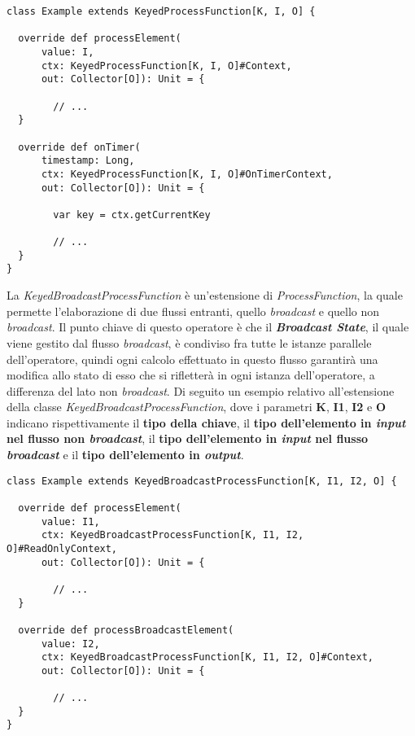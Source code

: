 \begin{verbatim}
class Example extends KeyedProcessFunction[K, I, O] {

  override def processElement(
      value: I, 
      ctx: KeyedProcessFunction[K, I, O]#Context, 
      out: Collector[O]): Unit = {
      
      	// ...
  }

  override def onTimer(
      timestamp: Long, 
      ctx: KeyedProcessFunction[K, I, O]#OnTimerContext, 
      out: Collector[O]): Unit = {
      
      	var key = ctx.getCurrentKey
      
      	// ...
  }
}
\end{verbatim}
La \textit{KeyedBroadcastProcessFunction} è un'estensione di \textit{ProcessFunction}, la quale permette l'elaborazione di due flussi entranti, quello \textit{broadcast} e quello non \textit{broadcast}. Il punto chiave di questo operatore è che il \textbf{\textit{Broadcast State}}, il quale viene gestito dal flusso \textit{broadcast}, è condiviso fra tutte le istanze parallele dell'operatore, quindi ogni calcolo effettuato in questo flusso garantirà una modifica allo stato di esso che si rifletterà in ogni istanza dell'operatore, a differenza del lato non \textit{broadcast}. Di seguito un esempio relativo all'estensione della classe \textit{KeyedBroadcastProcessFunction}, dove i parametri \textbf{K}, \textbf{I1}, \textbf{I2} e \textbf{O} indicano rispettivamente il \textbf{tipo della chiave}, il \textbf{tipo dell'elemento in \textit{input} nel flusso non \textit{broadcast}}, il \textbf{tipo dell'elemento in \textit{input} nel flusso \textit{broadcast}} e il \textbf{tipo dell'elemento in \textit{output}}.
\begin{verbatim}
class Example extends KeyedBroadcastProcessFunction[K, I1, I2, O] {

  override def processElement(
      value: I1, 
      ctx: KeyedBroadcastProcessFunction[K, I1, I2, O]#ReadOnlyContext, 
      out: Collector[O]): Unit = {
      
      	// ...
  }
  
  override def processBroadcastElement(
      value: I2, 
      ctx: KeyedBroadcastProcessFunction[K, I1, I2, O]#Context, 
      out: Collector[O]): Unit = {
      
      	// ...
  }
}
\end{verbatim}

